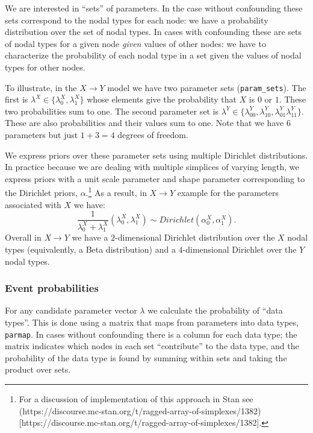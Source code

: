 \documentclass[
  11pt,
  article]{jss}
\begin{document}
We are interested in ``sets'' of parameters. In the case without
confounding these sets correspond to the nodal types for each node: we
have a probability distribution over the set of nodal types. In cases
with confounding these are sets of nodal types for a given node
\emph{given} values of other nodes: we have to characterize the
probability of each nodal type in a set given the values of nodal types
for other nodes.

To illustrate, in the \(X \rightarrow Y\) model we have two parameter
sets (\texttt{param\_sets}). The first is
\(\lambda^X \in \{\lambda^X_0, \lambda^X_1\}\) whose elements give the
probability that \(X\) is \(0\) or \(1\). These two probabilities sum to
one. The second parameter set is
\(\lambda^Y \in \{\lambda^Y_{00}, \lambda^Y_{10}, \lambda^Y_{01} \lambda^Y_{11}\}\).
These are also probabilities and their values sum to one. Note that we
have \(6\) parameters but just \(1 + 3 = 4\) degrees of freedom.

We express priors over these parameter sets using multiple Dirichlet
distributions. In practice because we are dealing with multiple
simplices of varying length, we express priors with a unit scale
parameter and shape parameter corresponding to the Dirichlet priors,
\(\alpha\).\footnote{For a discussion of implementation of this approach
  in Stan see
  (https://discourse.mc-stan.org/t/ragged-array-of-simplexes/1382){[}https://discourse.mc-stan.org/t/ragged-array-of-simplexes/1382{]}.}
As a result, in \(X \rightarrow Y\) example for the parameters
associated with \(X\) we have:
\[ \frac{1}{\lambda^X_0 +\lambda^X_1}(\lambda^X_0, \lambda^X_1) \sim Dirichlet(\alpha^X_0, \alpha^X_1).\]Overall
in \(X \rightarrow Y\) we have a \(2\)-dimensional Dirichlet
distribution over the \(X\) nodal types (equivalently, a Beta
distribution) and a \(4\)-dimensional Dirichlet over the \(Y\) nodal
types.

\hypertarget{event-probabilities}{%
\subsubsection{Event probabilities}\label{event-probabilities}}

For any candidate parameter vector \(\lambda\) we calculate the
probability of ``data types''. This is done using a matrix that maps
from parameters into data types, \texttt{parmap}. In cases without
confounding there is a column for each data type; the matrix indicates
which nodes in each set ``contribute'' to the data type, and the
probability of the data type is found by summing within sets and taking
the product over sets.
\end{document}
